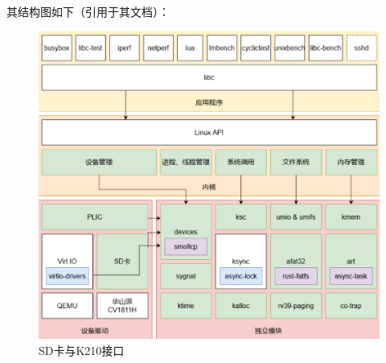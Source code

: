 其结构图如下（引用于其文档）：
\begin{figure}[H]
    \centering
    \includegraphics{figures/10-03-plntry.png}
    \caption{SD卡与K210接口}
\end{figure}

